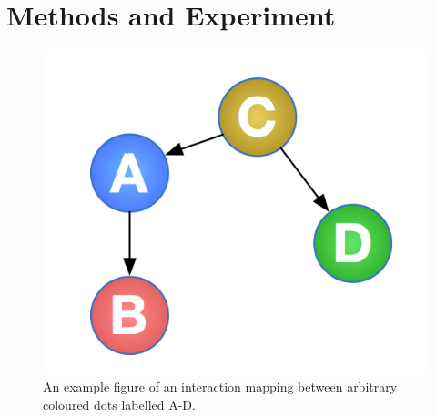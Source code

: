 \section{Methods and Experiment}

\lipsum

\begin{figure}
	\includegraphics{Resources/ABCD}
	\caption{An example figure of an interaction mapping between arbitrary coloured dots labelled A-D.}
\end{figure}

